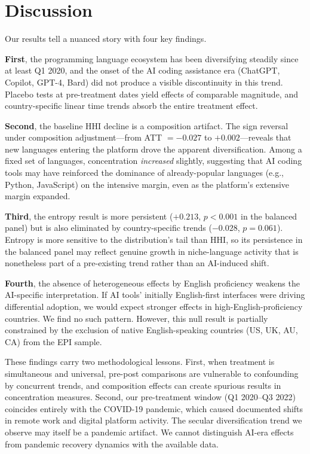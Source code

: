 \documentclass[12pt]{article}
\begin{document}
\section{Discussion}

Our results tell a nuanced story with four key findings.

\textbf{First}, the programming language ecosystem has been diversifying steadily since at least Q1 2020, and the onset of the AI coding assistance era (ChatGPT, Copilot, GPT-4, Bard) did not produce a visible discontinuity in this trend. Placebo tests at pre-treatment dates yield effects of comparable magnitude, and country-specific linear time trends absorb the entire treatment effect.

\textbf{Second}, the baseline HHI decline is a composition artifact. The sign reversal under composition adjustment---from ATT $= -0.027$ to $+0.002$---reveals that new languages entering the platform drove the apparent diversification. Among a fixed set of languages, concentration \textit{increased} slightly, suggesting that AI coding tools may have reinforced the dominance of already-popular languages (e.g., Python, JavaScript) on the intensive margin, even as the platform's extensive margin expanded.

\textbf{Third}, the entropy result is more persistent ($+0.213$, $p < 0.001$ in the balanced panel) but is also eliminated by country-specific trends ($-0.028$, $p = 0.061$). Entropy is more sensitive to the distribution's tail than HHI, so its persistence in the balanced panel may reflect genuine growth in niche-language activity that is nonetheless part of a pre-existing trend rather than an AI-induced shift.

\textbf{Fourth}, the absence of heterogeneous effects by English proficiency weakens the AI-specific interpretation. If AI tools' initially English-first interfaces were driving differential adoption, we would expect stronger effects in high-English-proficiency countries. We find no such pattern. However, this null result is partially constrained by the exclusion of native English-speaking countries (US, UK, AU, CA) from the EPI sample.

These findings carry two methodological lessons. First, when treatment is simultaneous and universal, pre-post comparisons are vulnerable to confounding by concurrent trends, and composition effects can create spurious results in concentration measures. Second, our pre-treatment window (Q1 2020--Q3 2022) coincides entirely with the COVID-19 pandemic, which caused documented shifts in remote work and digital platform activity. The secular diversification trend we observe may itself be a pandemic artifact. We cannot distinguish AI-era effects from pandemic recovery dynamics with the available data.
\end{document}
